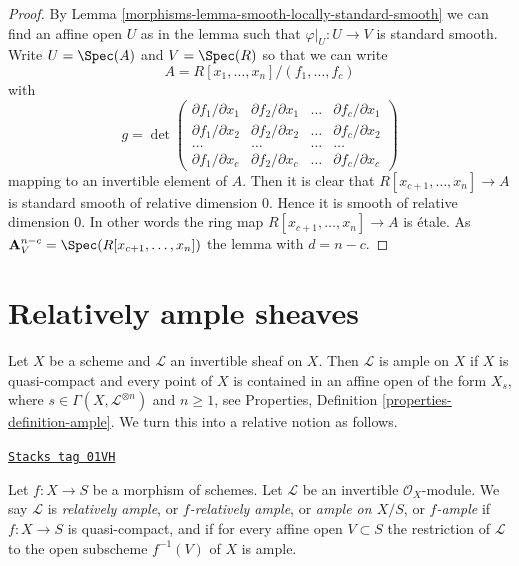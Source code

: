 \begin{proof}

By
Lemma \ref{morphisms-lemma-smooth-locally-standard-smooth}
we can find an affine open $U$ as in the lemma such that
$\varphi|_U : U \to V$ is standard smooth. Write
$U = \Spec(A)$ and $V = \Spec(R)$ so that we can write
$$
A = R[x_1, \ldots, x_n]/(f_1, \ldots, f_c)
$$
with
$$
g =
\det
\left(
\begin{matrix}
\partial f_1/\partial x_1 &
\partial f_2/\partial x_1 &
\ldots &
\partial f_c/\partial x_1 \\
\partial f_1/\partial x_2 &
\partial f_2/\partial x_2 &
\ldots &
\partial f_c/\partial x_2 \\
\ldots & \ldots & \ldots & \ldots \\
\partial f_1/\partial x_c &
\partial f_2/\partial x_c &
\ldots &
\partial f_c/\partial x_c
\end{matrix}
\right)
$$
mapping to an invertible element of $A$. Then it is clear that
$R[x_{c + 1}, \ldots, x_n] \to A$ is standard smooth of relative
dimension $0$. Hence it is smooth of relative dimension $0$.
In other words the ring map $R[x_{c + 1}, \ldots, x_n] \to A$
is \'etale. As $\mathbf{A}^{n - c}_V = \Spec(R[x_{c + 1}, \ldots, x_n])$
the lemma with $d = n - c$.
\end{proof}

\section{Relatively ample sheaves}
\label{morphisms-section-relatively-ample}
Let $X$ be a scheme and $\mathcal{L}$ an invertible sheaf on $X$.
Then $\mathcal{L}$ is ample on $X$ if $X$ is quasi-compact and
every point of $X$ is contained in an affine open of the form
$X_s$, where $s \in \Gamma(X, \mathcal{L}^{\otimes n})$ and $n \geq 1$, see
Properties, Definition \ref{properties-definition-ample}.
We turn this into a relative notion as follows.

\begin{definition}
\label{morphisms-definition-relatively-ample}
\href{https://stacks.math.columbia.edu/tag/01VH}{\texttt{Stacks tag 01VH}}

\begin{reference}
\cite[II Definition 4.6.1]{EGA}
\end{reference}
Let $f : X \to S$ be a morphism of schemes.
Let $\mathcal{L}$ be an invertible $\mathcal{O}_X$-module.
We say $\mathcal{L}$ is {\it relatively ample}, or {\it $f$-relatively ample},
or {\it ample on $X/S$}, or {\it $f$-ample} if $f : X \to S$
is quasi-compact, and if for every affine open $V \subset S$
the restriction of $\mathcal{L}$ to the open subscheme
$f^{-1}(V)$ of $X$ is ample.
\end{definition}

